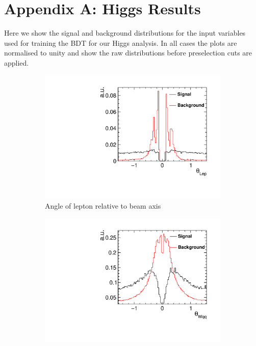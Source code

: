 
\section{Appendix A: Higgs Results}
\label{appendixA}
Here we show the signal and background distributions for the input variables used for training the BDT for our Higgs analysis. In all cases the plots are normalised to unity and show the raw distributions before preselection cuts are applied.

\begin{figure}[h] 
  \begin{subfigure}[]{0.5\linewidth}
    \centering
    \includegraphics[width=0.75\linewidth]{Appendix/figures/DiraLep} 
    \caption{Angle of lepton relative to beam axis} 
    \vspace{4ex}
  \end{subfigure}%
  \begin{subfigure}[]{0.5\linewidth}
    \centering
    \includegraphics[width=0.75\linewidth]{Appendix/figures/DiraWqq} 

\end{subfigure}
\end{figure}
